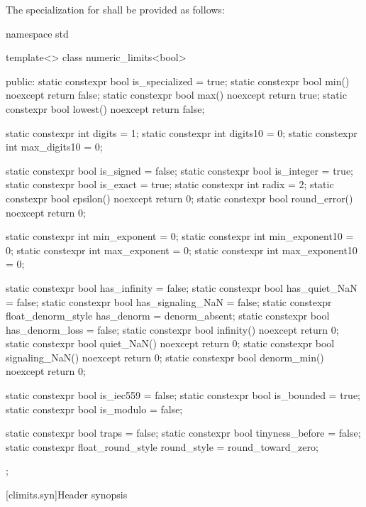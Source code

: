 \pnum
The specialization for
shall be provided as follows:
%
\begin{codeblock}
namespace std {
   template<> class numeric_limits<bool> {
   public:
     static constexpr bool is_specialized = true;
     static constexpr bool min() noexcept { return false; }
     static constexpr bool max() noexcept { return true; }
     static constexpr bool lowest() noexcept { return false; }

     static constexpr int  digits = 1;
     static constexpr int  digits10 = 0;
     static constexpr int  max_digits10 = 0;

     static constexpr bool is_signed = false;
     static constexpr bool is_integer = true;
     static constexpr bool is_exact = true;
     static constexpr int  radix = 2;
     static constexpr bool epsilon() noexcept { return 0; }
     static constexpr bool round_error() noexcept { return 0; }

     static constexpr int  min_exponent = 0;
     static constexpr int  min_exponent10 = 0;
     static constexpr int  max_exponent = 0;
     static constexpr int  max_exponent10 = 0;

     static constexpr bool has_infinity = false;
     static constexpr bool has_quiet_NaN = false;
     static constexpr bool has_signaling_NaN = false;
     static constexpr float_denorm_style has_denorm = denorm_absent;
     static constexpr bool has_denorm_loss = false;
     static constexpr bool infinity() noexcept { return 0; }
     static constexpr bool quiet_NaN() noexcept { return 0; }
     static constexpr bool signaling_NaN() noexcept { return 0; }
     static constexpr bool denorm_min() noexcept { return 0; }

     static constexpr bool is_iec559 = false;
     static constexpr bool is_bounded = true;
     static constexpr bool is_modulo = false;

     static constexpr bool traps = false;
     static constexpr bool tinyness_before = false;
     static constexpr float_round_style round_style = round_toward_zero;
   };
}
\end{codeblock}

[climits.syn]{Header  synopsis}

